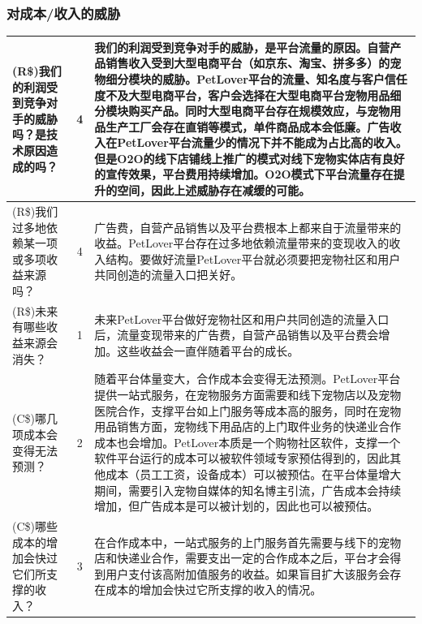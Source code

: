 \documentclass[a4paper]{ctexart}
\begin{document}
\subsubsection{对成本/收入的威胁}
\begin{table}[h]
  \centering
\begin{tabular}{|p{3.5cm}|c|p{10cm}|}
  \hline
  (R\$)我们的利润受到竞争对手的威胁吗？是技术原因造成的吗？ & 4 & 我们的利润受到竞争对手的威胁，是平台流量的原因。自营产品销售收入受到大型电商平台（如京东、淘宝、拼多多）的宠物细分模块的威胁。PetLover平台的流量、知名度与客户信任度不及大型电商平台，客户会选择在大型电商平台宠物用品细分模块购买产品。同时大型电商平台存在规模效应，与宠物用品生产工厂会存在直销等模式，单件商品成本会低廉。广告收入在PetLover平台流量少的情况下并不能成为占比高的收入。但是O2O的线下店铺线上推广的模式对线下宠物实体店有良好的宣传效果，平台费用持续增加。O2O模式下平台流量存在提升的空间，因此上述威胁存在减缓的可能。\\
  \hline
  (R\$)我们过多地依赖某一项或多项收益来源吗？ & 4 & 广告费，自营产品销售以及平台费根本上都来自于流量带来的收益。PetLover平台存在过多地依赖流量带来的变现收入的收入结构。要做好流量PetLover平台就必须要把宠物社区和用户共同创造的流量入口把关好。\\
  \hline
  (R\$)未来有哪些收益来源会消失？ & 1 & 未来PetLover平台做好宠物社区和用户共同创造的流量入口后，流量变现带来的广告费，自营产品销售以及平台费会增加。这些收益会一直伴随着平台的成长。\\
  \hline
  (C\$)哪几项成本会变得无法预测？ & 2 & 随着平台体量变大，合作成本会变得无法预测。PetLover平台提供一站式服务，在宠物服务方面需要和线下宠物店以及宠物医院合作，支撑平台如上门服务等成本高的服务，同时在宠物用品销售方面，宠物线下用品店的上门取件业务的快递业合作成本也会增加。PetLover本质是一个购物社区软件，支撑一个软件平台运行的成本可以被软件领域专家预估得到的，因此其他成本（员工工资，设备成本）可以被预估。在平台体量增大期间，需要引入宠物自媒体的知名博主引流，广告成本会持续增加，但广告成本是可以被计划的，因此也可以被预估。\\
  \hline
  (C\$)哪些成本的增加会快过它们所支撑的收入？& 3 & 在合作成本中，一站式服务的上门服务首先需要与线下的宠物店和快递业合作，需要支出一定的合作成本之后，平台才会得到用户支付该高附加值服务的收益。如果盲目扩大该服务会存在成本的增加会快过它所支撑的收入的情况。\\
  \hline
\end{tabular}
\end{table}

\FloatBarrier
\end{document}
